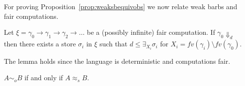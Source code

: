 \documentclass[main.tex]{subfiles}
\begin{document}
For proving Proposition~\ref{prop:weaksbequivobs} we now relate weak barbs and fair computations.

\begin{lemma}\label{lem:barbsfair}
Let $\xi = \gamma_0 \longrightarrow \gamma_1 \longrightarrow \gamma_2 \longrightarrow \ldots$ be a (possibly infinite) fair computation. If $\gamma_0 \Downarrow_d$ then there exists a store $\sigma_i$ in $\xi$ such that $d \leq \exists_{X_i} \sigma_i$ for $X_i = fv(\gamma_i) \setminus fv(\gamma_0)$.
\end{lemma}

The lemma holds since the language is deterministic and computations fair.

\begin{proposition}\label{prop:weaksbequivobs}
$A \sim_o B$ if and only if $A \approx_{\mathit{s}} B$.
\end{proposition}
\end{document}
